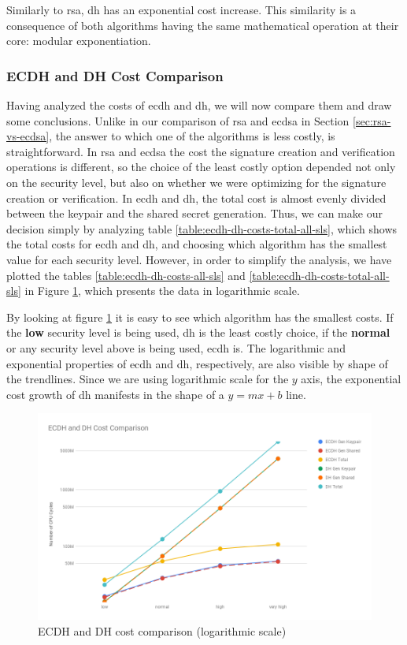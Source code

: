 Similarly to \gls{rsa}, \gls{dh} has an exponential cost increase. This similarity is a consequence of both algorithms having the same mathematical
operation at their core: modular exponentiation.

\subsubsection{ECDH and DH Cost Comparison}

Having analyzed the costs of \gls{ecdh} and \gls{dh}, we will now compare them and draw some conclusions. Unlike in our comparison of
\gls{rsa} and \gls{ecdsa} in Section \ref{sec:rsa-vs-ecdsa}, the answer to which one of the algorithms is less costly, is straightforward.
In \gls{rsa} and \gls{ecdsa} the cost the signature creation and verification operations is different, so the choice of the least costly
option depended not only on the security level, but also on whether we were optimizing for the signature creation or verification. In \gls{ecdh} and \gls{dh},
the total cost is almost evenly divided between the keypair and the shared secret generation. Thus, we can make our decision simply
by analyzing table \ref{table:ecdh-dh-costs-total-all-sls}, which shows the total costs for \gls{ecdh} and \gls{dh}, and choosing which algorithm has the smallest value for each security level.
However, in order to simplify the analysis, we have plotted the tables \ref{table:ecdh-dh-costs-all-sls} and \ref{table:ecdh-dh-costs-total-all-sls} in Figure \ref{fig:ecdh-dh-costs-all}, which
presents the data in logarithmic scale.

By looking at figure \ref{fig:ecdh-dh-costs-all} it is easy to see which algorithm has the smallest costs. If the \textbf{low} security level is being used,
\gls{dh} is the least costly choice, if the \textbf{normal} or any security level above is being used, \gls{ecdh} is. The logarithmic and exponential 
properties of \gls{ecdh} and \gls{dh}, respectively, are also visible by shape of the trendlines. Since we are using logarithmic scale for the $y$ axis, the
exponential cost growth of \gls{dh} manifests in the shape of a $y=mx+b$ line.

\begin{figure}
  \centering
  \includegraphics[width=1.0\textwidth]{img/ecdh_dh_costs_all.png}
  \centering \caption{\label{fig:ecdh-dh-costs-all} ECDH and DH cost comparison (logarithmic scale)}
\end{figure}

